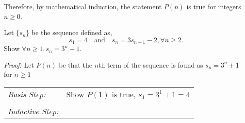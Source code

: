 \begin{questions}
\begin{solution}
  Therefore, by mathematical induction, the statement $P(n)$ is true for integers $n \geq 0$.
\end{solution}








 Let $\{s_n\}$ be the sequence defined as, 
\[ s_1 = 4 \quad \text{and} \quad s_n = 3s_{n-1} - 2, \forall n \geq 2. \]
Show $\forall n \geq 1, s_n = 3^n + 1.$
    \ifprintanswers
        \vspace{-10pt}
   \fi
\begin{solution}
  \textit{Proof:}
  Let $P(n)$ be that the $n$th term of the sequence is found as $s_n = 3^n + 1$ for $n \geq 1$

  \smallskip
  \begin{tabular}{lp{4in}}
    \textit{Basis Step:} & Show $P(1)$ is true, $s_1 = 3^1 + 1 = 4$ \\
     & \\
   \textit{Inductive Step:} &  \\
  \end{tabular}


\end{solution}
\end{questions}
